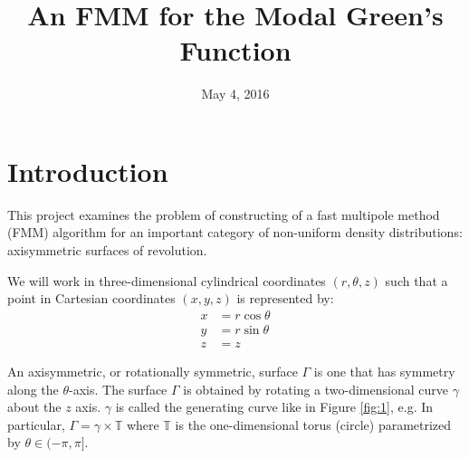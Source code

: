 \documentclass[11pt, oneside]{article}   	%
\title{An FMM for the Modal Green's Function}
\date{May 4, 2016}
\begin{document}
\maketitle

\section{Introduction}
This project examines the problem of constructing of a fast multipole method (FMM) algorithm for an important category of non-uniform density distributions: axisymmetric surfaces of revolution.

We will work in three-dimensional cylindrical coordinates $(r,\theta,z)$ such that a point in Cartesian coordinates $(x,y,z)$ is represented by:
\begin{align*}
x &= r\cos\theta\\
y &= r\sin\theta\\
z &= z
\end{align*}

An axisymmetric, or rotationally symmetric, surface $\Gamma$ is one that has symmetry along the $\theta$-axis. The surface $\Gamma$ is obtained by rotating a two-dimensional curve $\gamma$ about the $z$ axis. $\gamma$ is called the generating curve like in Figure \ref{fig:1}, e.g. In particular, $\Gamma=\gamma\times\mathbb{T}$ where $\mathbb{T}$ is the one-dimensional torus (circle) parametrized by $\theta\in(-\pi,\pi]$.
\end{document}
